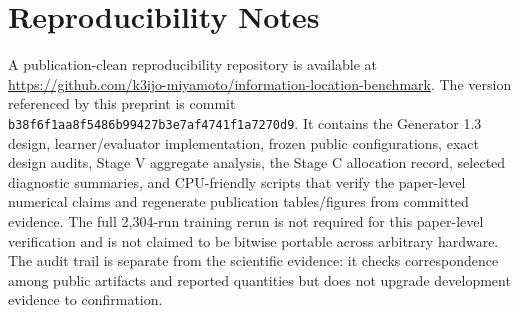 \documentclass[11pt]{article}
\begin{document}
\section{Reproducibility Notes}

A publication-clean reproducibility repository is available at \url{https://github.com/k3ijo-miyamoto/information-location-benchmark}. The version referenced by this preprint is commit \texttt{b38f6f1aa8f5486b99427b3e7af4741f1a7270d9}. It contains the Generator 1.3 design, learner/evaluator implementation, frozen public configurations, exact design audits, Stage V aggregate analysis, the Stage C allocation record, selected diagnostic summaries, and CPU-friendly scripts that verify the paper-level numerical claims and regenerate publication tables/figures from committed evidence. The full 2,304-run training rerun is not required for this paper-level verification and is not claimed to be bitwise portable across arbitrary hardware. The audit trail is separate from the scientific evidence: it checks correspondence among public artifacts and reported quantities but does not upgrade development evidence to confirmation.


\end{document}
